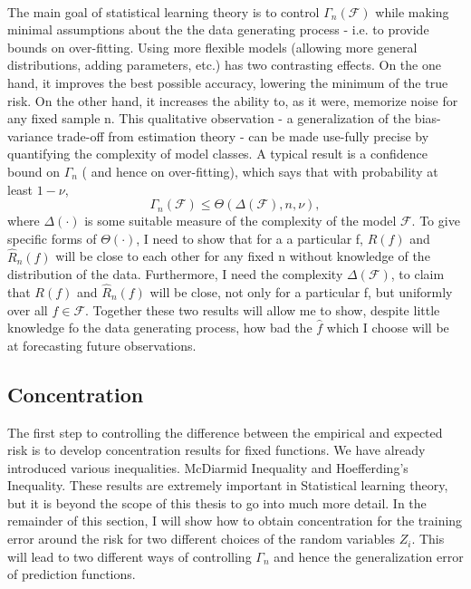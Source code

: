\documentclass[12pt, oneside, a4paper]{article}
\def\cF{\ensuremath{\mathcal{F}}}
\theoremstyle{plain}
\renewcommand{\hat}[1]{\widehat{#1}}
\theoremstyle{definition}
\begin{document}
\paragraph{} The main goal of statistical learning theory is to control $\Gamma_n(\cF)$ while making minimal assumptions about the the data generating 
process - i.e. to provide bounds on over-fitting. Using more flexible models (allowing more general distributions, adding parameters, etc.) has two 
contrasting effects. On the one hand, it improves the best possible accuracy, lowering the minimum of the true risk. On the other hand, it increases 
the ability to, as it were, memorize noise for any fixed sample n. This qualitative observation - a generalization of the bias-variance trade-off from
estimation theory - can be made use-fully precise by quantifying the complexity of model classes. A typical result is a confidence bound on $\Gamma_n$ (
and hence on over-fitting), which says that with probability at least $1 - \nu$,
\begin{equation}
\Gamma_n(\cF) \leq \Theta(\Delta(\cF), n, \nu),
\end{equation} 
where $\Delta(\cdot)$ is some suitable measure of the complexity of the model $\cF$. To give specific forms of $\Theta(\cdot)$, I need to show that
for a a particular f, $R(f)$ and $\hat{R}_{n}(f)$ will be close to each other for any fixed n without knowledge of the distribution of the data. 
Furthermore, I need the complexity $\Delta(\cF)$, to claim that $R(f)$ and $\hat{R}_{n}(f)$ will be close, not only for a particular f, but
uniformly over all $f \in \cF$. Together these two results will allow me to show, despite little knowledge fo the data generating process, how bad the $
\hat{f}$ which I choose will be at forecasting future observations.
\subsection{Concentration}
The first step to controlling the difference between the empirical and expected risk is to develop concentration results for fixed functions.
We have already introduced various inequalities. McDiarmid Inequality and Hoefferding's Inequality.
These results are extremely important in Statistical learning theory, but it is beyond the scope of this thesis to go into much more detail.
In the remainder of this section, I will show how to obtain concentration for the training error around the risk for two different choices of the random
variables $Z_i$. This will lead to two different ways of controlling $\Gamma_n$ and hence the generalization error of prediction functions. 
\end{document}
